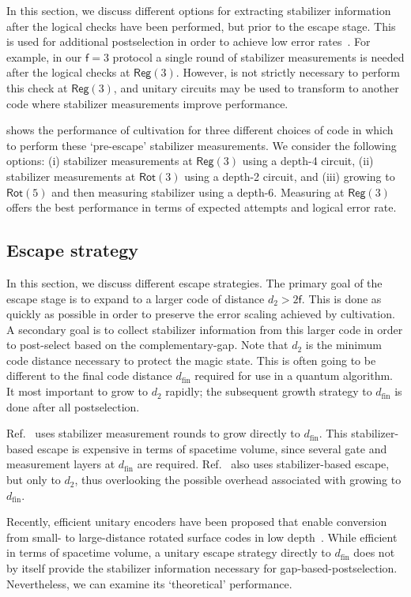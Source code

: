 \documentclass[%
    aps, 
    physrev,
    reprint,
]{revtex4-2}
\newcommand{\fd}[1]{\mathsf{f}=#1}
\newcommand{\rot}[1]{\mathsf{Rot}(#1)}
\newcommand{\reg}[1]{\mathsf{Reg}(#1)}
\newcommand{\fin}{_\mathrm{fin}}
\begin{document}
In this section, we discuss different options for extracting stabilizer information after the logical checks have been performed, but prior to the escape stage.
This is used for additional postselection in order
to achieve low error rates~\cite{chamberland2020very}. 
For example, in our $\fd3$ protocol a single round of stabilizer measurements is needed after the logical checks at $\reg3$.
However, is not strictly necessary to perform this check at $\reg3$, and unitary circuits may be used to transform to another code where stabilizer measurements improve performance. 

 shows the performance of cultivation for three different choices of code in which to perform these `pre-escape' stabilizer measurements.
We consider the following options: (i) stabilizer measurements at $\reg3$ using a depth-4 circuit, (ii) stabilizer measurements at $\rot3$ using a depth-2 circuit, and (iii) growing to $\rot5$ and then measuring stabilizer using a depth-6. 
Measuring at $\reg3$ offers the best performance in terms of expected attempts and logical error rate.

\subsection{Escape strategy}\label{app:escapestrat}

In this section, we discuss different escape strategies.
The primary goal of the escape stage is to expand to a larger code of distance $d_2  > 2 \mathsf{f}$.
{This is done} as quickly as possible in order to preserve the error scaling achieved by cultivation.
A secondary goal is to collect stabilizer information from this larger code in order to post-select based on the complementary-gap.
Note that $d_2$ is the minimum code distance necessary to protect the magic state.
This is often going to be different to the final code distance $d\fin$ required for use in a quantum algorithm.
It most important to grow to $d_2$ rapidly; the subsequent growth strategy to $d\fin$ is done after all postselection.

 
Ref.~\cite{gidney2024magic} uses stabilizer measurement rounds to grow directly to $d\fin$. 
This stabilizer-based escape is expensive in terms of spacetime volume, since several gate and measurement layers at $d\fin$ are required.
Ref.~\cite{chen2025efficient} also uses stabilizer-based escape, but only to $d_2$, thus overlooking the possible overhead associated with growing to $d\fin$.

Recently, efficient unitary encoders have been proposed that enable conversion from small- to large-distance rotated surface codes in low depth~\cite{tsai2025unitary, higgott2021optimal}. 
While efficient in terms of spacetime volume, a unitary escape strategy directly to $d\fin$ does not by itself provide the stabilizer information necessary for gap-based-postselection. 
Nevertheless, we can examine its `theoretical' performance.
\end{document}
